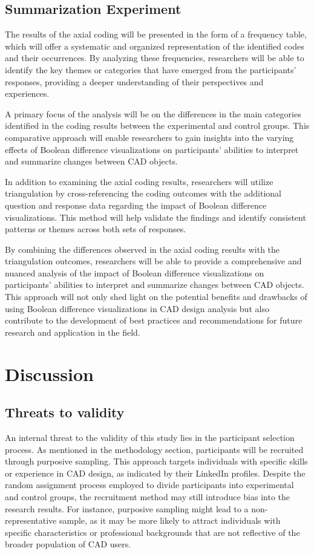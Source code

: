 \documentclass[sigconf,authorversion,nonacm]{acmart}
\begin{document}
\subsection{Summarization Experiment}

The results of the axial coding will be presented in the form of a frequency table, which will offer a systematic and organized representation of the identified codes and their occurrences.
By analyzing these frequencies, researchers will be able to identify the key themes or categories that have emerged from the participants' responses, providing a deeper understanding of their perspectives and experiences.

A primary focus of the analysis will be on the differences in the main categories identified in the coding results between the experimental and control groups.
This comparative approach will enable researchers to gain insights into the varying effects of Boolean difference visualizations on participants' abilities to interpret and summarize changes between CAD objects.

In addition to examining the axial coding results, researchers will utilize triangulation by cross-referencing the coding outcomes with the additional question and response data regarding the impact of Boolean difference visualizations.
This method will help validate the findings and identify consistent patterns or themes across both sets of responses.

By combining the differences observed in the axial coding results with the triangulation outcomes, researchers will be able to provide a comprehensive and nuanced analysis of the impact of Boolean difference visualizations on participants' abilities to interpret and summarize changes between CAD objects.
This approach will not only shed light on the potential benefits and drawbacks of using Boolean difference visualizations in CAD design analysis but also contribute to the development of best practices and recommendations for future research and application in the field.


\section{Discussion}


\subsection{Threats to validity}
An internal threat to the validity of this study lies in the participant selection process. As mentioned in the methodology section, participants will be recruited through purposive sampling.
This approach targets individuals with specific skills or experience in CAD design, as indicated by their LinkedIn profiles. Despite the random assignment process employed to divide participants into experimental and control groups, the recruitment method may still introduce bias into the research results.
For instance, purposive sampling might lead to a non-representative sample, as it may be more likely to attract individuals with specific characteristics or professional backgrounds that are not reflective of the broader population of CAD users.
\end{document}

